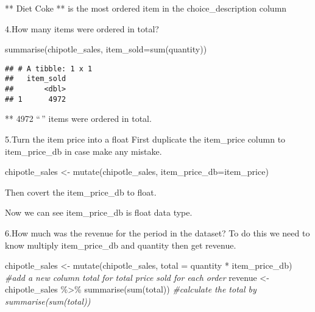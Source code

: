 \documentclass[
]{article}
\newenvironment{Shaded}{\begin{snugshade}}{\end{snugshade}}
\newcommand{\AttributeTok}[1]{\textcolor[rgb]{0.77,0.63,0.00}{#1}}
\newcommand{\CommentTok}[1]{\textcolor[rgb]{0.56,0.35,0.01}{\textit{#1}}}
\newcommand{\FunctionTok}[1]{\textcolor[rgb]{0.00,0.00,0.00}{#1}}
\newcommand{\NormalTok}[1]{#1}
\newcommand{\OtherTok}[1]{\textcolor[rgb]{0.56,0.35,0.01}{#1}}
\newcommand{\SpecialCharTok}[1]{\textcolor[rgb]{0.00,0.00,0.00}{#1}}
\newcommand{\StringTok}[1]{\textcolor[rgb]{0.31,0.60,0.02}{#1}}
\begin{document}
** Diet Coke ** is the most ordered item in the choice\_description
column

4.How many items were ordered in total?

\begin{Shaded}
\begin{Highlighting}[]
\FunctionTok{summarise}\NormalTok{(chipotle\_sales, }\AttributeTok{item\_sold=}\FunctionTok{sum}\NormalTok{(quantity))}
\end{Highlighting}
\end{Shaded}

\begin{verbatim}
## # A tibble: 1 x 1
##   item_sold
##       <dbl>
## 1      4972
\end{verbatim}

** 4972 ``\,'' items were ordered in total.

5.Turn the item price into a float First duplicate the item\_price
column to item\_price\_db in case make any mistake.

\begin{Shaded}
\begin{Highlighting}[]
\NormalTok{chipotle\_sales }\OtherTok{\textless{}{-}} \FunctionTok{mutate}\NormalTok{(chipotle\_sales, }\AttributeTok{item\_price\_db=}\NormalTok{item\_price)}
\end{Highlighting}
\end{Shaded}

Then covert the item\_price\_db to float.

\begin{Shaded}
\end{Shaded}

Now we can see item\_price\_db is float data type.

6.How much was the revenue for the period in the dataset? To do this we
need to know multiply item\_price\_db and quantity then get revenue.

\begin{Shaded}
\begin{Highlighting}[]
\NormalTok{chipotle\_sales }\OtherTok{\textless{}{-}} \FunctionTok{mutate}\NormalTok{(chipotle\_sales, }\AttributeTok{total =}\NormalTok{ quantity }\SpecialCharTok{*}\NormalTok{ item\_price\_db) }\CommentTok{\#add a new column total for total price sold for each order}
\NormalTok{revenue }\OtherTok{\textless{}{-}}\NormalTok{ chipotle\_sales }\SpecialCharTok{\%\textgreater{}\%} \FunctionTok{summarise}\NormalTok{(}\FunctionTok{sum}\NormalTok{(total)) }\CommentTok{\#calculate the total by summarise(sum(total))}
\end{Highlighting}
\end{Shaded}
\end{document}
